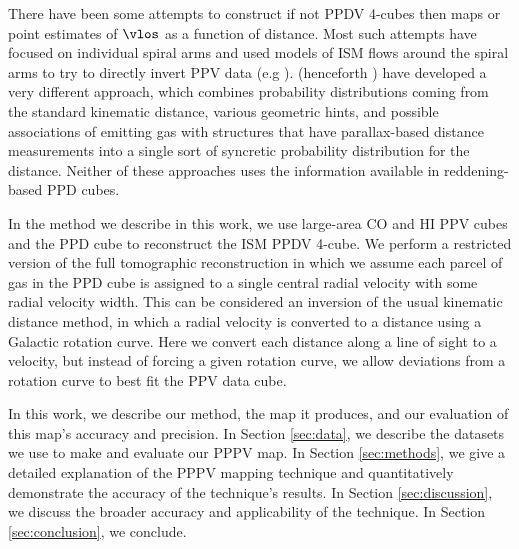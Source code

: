 There have been some attempts to construct if not PPDV 4-cubes then maps or point estimates of $\vlos$ as a function of distance. 
Most such attempts have focused on individual spiral arms and used models of ISM flows around the spiral arms to try to directly invert PPV data (e.g  \citealt{1972A&A....16..118S,Foster_2006}).
\citet{Reid_2016} (henceforth \Reid{}) have developed a very different approach, which combines probability distributions coming from the standard kinematic distance, various geometric hints, and possible associations of emitting gas with structures that have parallax-based distance measurements into a single sort of syncretic probability distribution for the distance. 
Neither of these approaches uses the information available in reddening-based PPD cubes. 

In the method we describe in this work, we use large-area CO and HI PPV cubes and the \citet{Green_2015} PPD cube to reconstruct the ISM PPDV 4-cube. We perform a restricted version of the full tomographic reconstruction in which we assume each parcel of gas in the PPD cube is assigned to a single central radial velocity with some radial velocity width. This can be considered an inversion of the usual kinematic distance method, in which a radial velocity is converted to a distance using a Galactic rotation curve. Here we convert each distance along a line of sight to a velocity, but instead of forcing a given rotation curve, we allow deviations from a rotation curve to best fit the PPV data cube.

In this work, we describe our method, the map it produces, and our evaluation of this map's accuracy and precision.
In Section \ref{sec:data}, we describe the datasets we use to make and evaluate our PPPV map.
In Section \ref{sec:methods}, we give a detailed explanation of the PPPV mapping technique and quantitatively demonstrate the accuracy of the technique's results.
In Section \ref{sec:discussion}, we discuss the broader accuracy and applicability of the technique.
In Section \ref{sec:conclusion}, we conclude.
